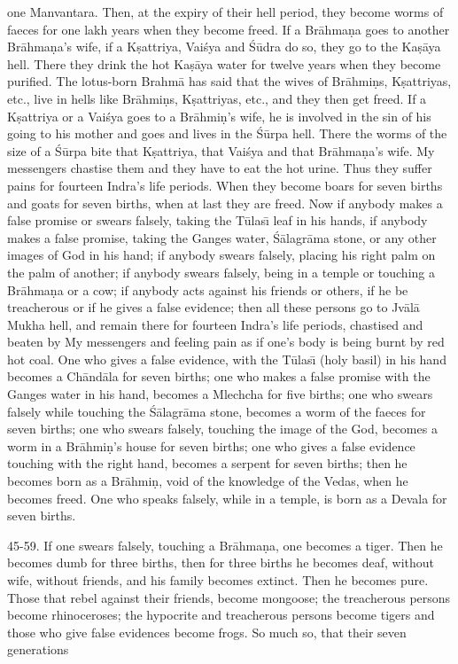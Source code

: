 one Manvantara. Then, at the expiry of their hell period, they become worms of faeces for one lakh years when they become freed. If a Br\=ahma\d{n}a goes to another Br\=ahma\d{n}a's wife, if a K\d{s}attriya, Vai\'sya and \'S\=udra do so, they go to the Ka\d{s}\=aya hell. There they drink the hot Ka\d{s}\=aya water for twelve years when they become purified. The lotus-born Brahm\=a has said that the wives of Br\=ahmi\d{n}s, K\d{s}attriyas, etc., live in hells like Br\=ahmi\d{n}s, K\d{s}attriyas, etc., and they then get freed. If a K\d{s}attriya or a Vai\'sya goes to a Br\=ahmi\d{n}'s wife, he is involved in the sin of his going to his mother and goes and lives in the \'S\=urpa hell. There the worms of the size of a \'S\=urpa bite that K\d{s}attriya, that Vai\'sya and that Br\=ahma\d{n}a's wife. My messengers chastise them and they have to eat the hot urine. Thus they suffer pains for fourteen Indra's life periods. When they become boars for seven births and goats for seven births, when at last they are freed. Now if anybody makes a false promise or swears falsely, taking the T\=ulas\={\i} leaf in his hands, if anybody makes a false promise, taking the Ganges water, \'S\=alagr\=ama stone, or any other images of God in his hand; if anybody swears falsely, placing his right palm on the palm of another; if anybody swears falsely, being in a temple or touching a Br\=ahma\d{n}a or a cow; if anybody acts against his friends or others, if he be treacherous or if he gives a false evidence; then all these persons go to Jv\=al\=a Mukha hell, and remain there for fourteen Indra's life periods, chastised and beaten by My messengers and feeling pain as if one's body is being burnt by red hot coal. One who gives a false evidence, with the T\=ulas\={\i} (holy basil) in his hand becomes a Ch\=and\=ala for seven births; one who makes a false promise with the Ganges water in his hand, becomes a Mlechcha for five births; one who swears falsely while touching the \'S\=alagr\=ama stone, becomes a worm of the faeces for seven births; one who swears falsely, touching the image of the God, becomes a worm in a Br\=ahmi\d{n}'s house for seven births; one who gives a false evidence touching with the right hand, becomes a serpent for seven births; then he becomes born as a Br\=ahmi\d{n}, void of the knowledge of the Vedas, when he becomes freed. One who speaks falsely, while in a temple, is born as a Devala for seven births.

45-59. If one swears falsely, touching a Br\=ahma\d{n}a, one becomes a tiger. Then he becomes dumb for three births, then for three births he becomes deaf, without wife, without friends, and his family becomes extinct. Then he becomes pure. Those that rebel against their friends, become mongoose; the treacherous persons become rhinoceroses; the hypocrite and treacherous persons become tigers and those who give false evidences become frogs. So much so, that their seven generations

